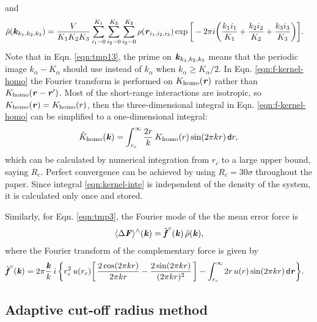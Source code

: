 \documentclass[aps,pre,preprint]{revtex4-1}
\renewcommand{\v}[1]{\textbf{\textit{#1}}}
\renewcommand{\d}[1]{\textsf{#1}}
\begin{document}
and
\begin{align}
  \hat\rho(\v k_{k_1,k_2,k_3})
  & =
  \frac{V}{K_1K_2K_3}
  \sum_{i_1=0}^{K_1}\sum_{i_2=0}^{K_2}\sum_{i_2=0}^{K_2}
  \rho(\v r_{i_1,i_2,i_3})
  \exp\bigg[
  -2\pi i\bigg(
  \frac{k_1i_1}{K_1} + \frac{k_2i_2}{K_2} + \frac{k_3i_3}{K_3}
  \bigg)
  \bigg].
\end{align}
Note that in Eqn. \eqref{eqn:tmp13}, the prime on $\v k_{k_1,k_2,k_3}$ means
that the periodic image $k_\alpha - K_\alpha$ should use instead of
$k_\alpha$ when $k_\alpha \geq K_\alpha/2$.
In Eqn. \eqref{eqn:f-kernel-homo}
the Fourier transform is performed on $K_{\textrm{homo}}(\v r)$ rather than
$K_{\textrm{homo}}(\v r - \v r')$.
Most of the short-range
interactions are isotropic, so  $K_{\textrm{homo}}(\v r) =
K_{\textrm{homo}}(r)$, then the three-dimensional integral in
Eqn. \eqref{eqn:f-kernel-homo} can be simplified to a one-dimensional
integral:
\begin{align}\label{eqn:kernel-inte}
  \hat{K}_{\textrm{homo}}(\v k)
  =
  \int_{r_c}^\infty \frac{2 r}k\, K_{\textrm{homo}}(r) \sin(2\pi kr)\,\d dr,
\end{align}
which can be calculated by numerical
integration from $r_c$ to a large upper bound, saying $R_c$. Perfect
convergence can be achieved by using $R_c = 30\sigma$ throughout the
paper. Since integral \eqref{eqn:kernel-inte} is independent of the
density of the system, it is calculated only once and stored.

Similarly, for Eqn. \eqref{eqn:tmp3}, the Fourier mode of the the mean error
force is
\begin{align}\label{eqn:tmp17}
  \langle\Delta\v F\rangle^\wedge(\v k) =
  \hat{\v f}^c(\v k)\,
  \hat\rho(\v k),
\end{align}
where the Fourier transform of the complementary force is given by
\begin{align}\label{eqn:tmp18}
  \hat{\v f}^c(\v k) 
  & = 
  2\pi\frac{\v k}k\, i\,
  \bigg\{
  r_c^2\,u(r_c)
  \bigg[\,
  \frac{2\cos(2\pi kr)}{2\pi kr}
  -\frac{2\sin(2\pi kr)}{(2\pi kr)^2}
  \,\bigg] 
  -
  \int_{r_c}^\infty 2r\,u(r)\sin(2\pi kr)\,\d d\v r
  \bigg\}.
\end{align}


\subsection{Adaptive cut-off radius method}
\end{document}
